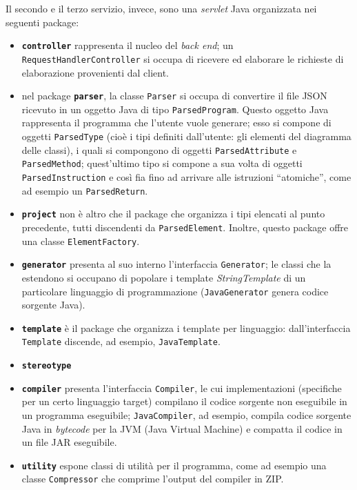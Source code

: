 Il secondo e il terzo servizio, invece, sono una \emph{servlet} Java organizzata nei seguenti package:
\begin{itemize}
	\item \textbf{\texttt{controller}} rappresenta il nucleo del \emph{back end}; un \texttt{RequestHandlerController} si occupa di ricevere ed elaborare le richieste di elaborazione provenienti dal client.
	\item nel package \textbf{\texttt{parser}}, la classe \texttt{Parser} si occupa di convertire il file JSON ricevuto in un oggetto Java di tipo \texttt{ParsedProgram}. Questo oggetto Java rappresenta il programma che l'utente vuole generare; esso si compone di oggetti \texttt{ParsedType} (cioè i tipi definiti dall'utente: gli elementi del diagramma delle classi), i quali si compongono di oggetti \texttt{ParsedAttribute} e \texttt{ParsedMethod}; quest'ultimo tipo si compone a sua volta di oggetti \texttt{ParsedInstruction} e così fia fino ad arrivare alle istruzioni “atomiche”, come ad esempio un \texttt{ParsedReturn}.
	\item \textbf{\texttt{project}} non è altro che il package che organizza i tipi elencati al punto precedente, tutti discendenti da \texttt{ParsedElement}. Inoltre, questo package offre una classe \texttt{ElementFactory}. %
	\item \textbf{\texttt{generator}} presenta al suo interno l'interfaccia \texttt{Generator}; le classi che la estendono si occupano di popolare i template \emph{StringTemplate} di un particolare linguaggio di programmazione (\texttt{JavaGenerator} genera codice sorgente Java). %
	\item \textbf{\texttt{template}} è il package che organizza i template per linguaggio: dall'interfaccia \texttt{Template} discende, ad esempio, \texttt{JavaTemplate}.
	\item \textbf{\texttt{stereotype}} %
	\item \textbf{\texttt{compiler}} presenta l'interfaccia \texttt{Compiler}, le cui implementazioni (specifiche per un certo linguaggio target) compilano il codice sorgente non eseguibile in un programma eseguibile; \texttt{JavaCompiler}, ad esempio, compila codice sorgente Java in \emph{bytecode} per la JVM (Java Virtual Machine) e compatta il codice in un file JAR eseguibile.
	\item \textbf{\texttt{utility}} espone classi di utilità per il programma, come ad esempio una classe \texttt{Compressor} che comprime l'output del compiler in ZIP. %
\end{itemize}

